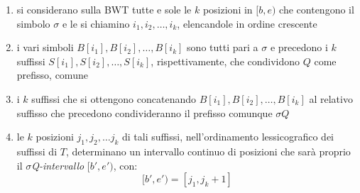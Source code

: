 \documentclass[a4paper,12pt, oneside]{book}
\begin{document}
\begin{enumerate}
  \item si considerano sulla BWT tutte e sole le $k$ posizioni in $[b,e)$ che
  contengono il simbolo $\sigma$ e le si chiamino $i_1,i_2,\ldots, i_k$,
  elencandole in ordine crescente
  \item i vari simboli $B[i_1],B[i_2],\ldots,B[i_k]$ sono tutti pari a $\sigma $
  e precedono i $k$ suffissi $S[i_1],S[i_2],\ldots,S[i_k]$, rispettivamente,
  che condividono $Q$ come prefisso, comune
  \item i $k$ suffissi che si ottengono concatenando
  $B[i_1],B[i_2],\ldots,B[i_k]$ al relativo suffisso che precedono
  condivideranno il prefisso comunque $\sigma Q$
  \item le $k$ posizioni $j_1,j_2,\ldots j_k$ di tali suffissi, nell'ordinamento
  lessicografico dei suffissi di $T$, determinano un intervallo continuo di
  posizioni che sarà proprio il \textit{$\sigma$Q-intervallo} $[b',e')$, con:
  \[[b',e')=[j_1,j_k+1]\]
\end{enumerate}
\end{document}
